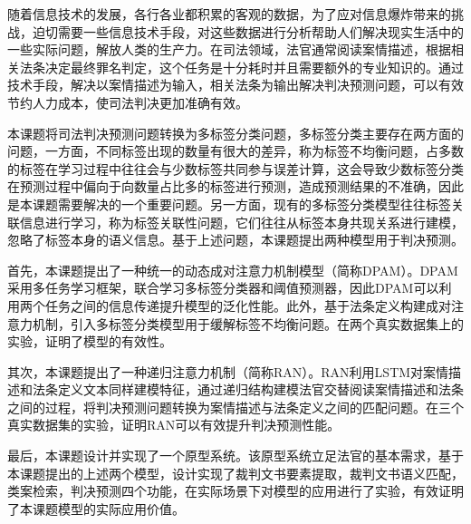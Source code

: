 \begin{cabstract}
随着信息技术的发展，各行各业都积累的客观的数据，为了应对信息爆炸带来的挑战，迫切需要一些信息技术手段，对这些数据进行分析帮助人们解决现实生活中的一些实际问题，解放人类的生产力。在司法领域，法官通常阅读案情描述，根据相关法条决定最终罪名判定，这个任务是十分耗时并且需要额外的专业知识的。通过技术手段，解决以案情描述为输入，相关法条为输出解决判决预测问题，可以有效节约人力成本，使司法判决更加准确有效。

本课题将司法判决预测问题转换为多标签分类问题，多标签分类主要存在两方面的问题，一方面，不同标签出现的数量有很大的差异，称为标签不均衡问题，占多数的标签在学习过程中往往会与少数标签共同参与误差计算，这会导致少数标签分类在预测过程中偏向于向数量占比多的标签进行预测，造成预测结果的不准确，因此是本课题需要解决的一个重要问题。另一方面，现有的多标签分类模型往往标签关联信息进行学习，称为标签关联性问题，它们往往从标签本身共现关系进行建模，忽略了标签本身的语义信息。基于上述问题，本课题提出两种模型用于判决预测。

首先，本课题提出了一种统一的动态成对注意力机制模型（简称DPAM）。DPAM采用多任务学习框架，联合学习多标签分类器和阈值预测器，因此DPAM可以利用两个任务之间的信息传递提升模型的泛化性能。此外，基于法条定义构建成对注意力机制，引入多标签分类模型用于缓解标签不均衡问题。在两个真实数据集上的实验，证明了模型的有效性。

其次，本课题提出了一种递归注意力机制（简称RAN）。RAN利用LSTM对案情描述和法条定义文本同样建模特征，通过递归结构建模法官交替阅读案情描述和法条之间的过程，将判决预测问题转换为案情描述与法条定义之间的匹配问题。在三个真实数据集的实验，证明RAN可以有效提升判决预测性能。

最后，本课题设计并实现了一个原型系统。该原型系统立足法官的基本需求，基于本课题提出的上述两个模型，设计实现了裁判文书要素提取，裁判文书语义匹配，类案检索，判决预测四个功能，在实际场景下对模型的应用进行了实验，有效证明了本课题模型的实际应用价值。
\end{cabstract}

